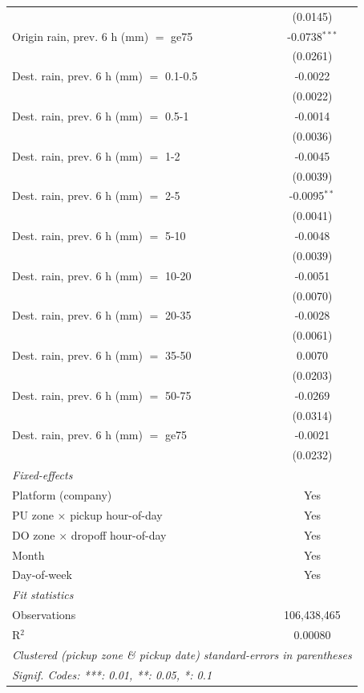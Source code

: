 \begin{tabular}{lc}
    & (0.0145)\\
   Origin rain, prev. 6 h (mm) $=$ ge75 & -0.0738$^{***}$\\
    & (0.0261)\\
   Dest. rain, prev. 6 h (mm) $=$ 0.1-0.5 & -0.0022\\
    & (0.0022)\\
   Dest. rain, prev. 6 h (mm) $=$ 0.5-1 & -0.0014\\
    & (0.0036)\\
   Dest. rain, prev. 6 h (mm) $=$ 1-2 & -0.0045\\
    & (0.0039)\\
   Dest. rain, prev. 6 h (mm) $=$ 2-5 & -0.0095$^{**}$\\
    & (0.0041)\\
   Dest. rain, prev. 6 h (mm) $=$ 5-10 & -0.0048\\
    & (0.0039)\\
   Dest. rain, prev. 6 h (mm) $=$ 10-20 & -0.0051\\
    & (0.0070)\\
   Dest. rain, prev. 6 h (mm) $=$ 20-35 & -0.0028\\
    & (0.0061)\\
   Dest. rain, prev. 6 h (mm) $=$ 35-50 & 0.0070\\
    & (0.0203)\\
   Dest. rain, prev. 6 h (mm) $=$ 50-75 & -0.0269\\
    & (0.0314)\\
   Dest. rain, prev. 6 h (mm) $=$ ge75 & -0.0021\\
    & (0.0232)\\
   \midrule
   \emph{Fixed-effects}\\
   Platform (company) & Yes\\
   PU zone $\times$ pickup hour-of-day & Yes\\
   DO zone $\times$ dropoff hour-of-day & Yes\\
   Month & Yes\\
   Day-of-week & Yes\\
   \midrule
   \emph{Fit statistics}\\
   Observations & 106,438,465\\
   R$^2$ & 0.00080\\
   \midrule \midrule
   \multicolumn{2}{l}{\emph{Clustered (pickup zone \& pickup date) standard-errors in parentheses}}\\
   \multicolumn{2}{l}{\emph{Signif. Codes: ***: 0.01, **: 0.05, *: 0.1}}\\
\end{tabular}
 
